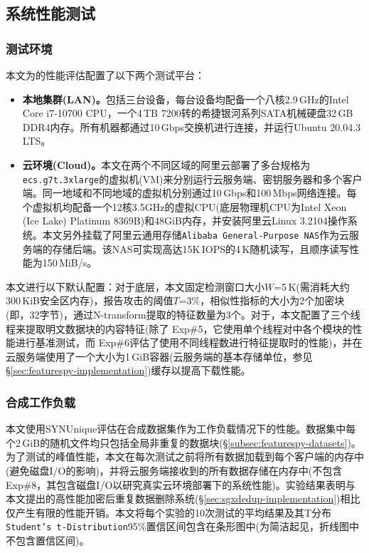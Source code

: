 \subsection{系统性能测试}
\label{subsec:featurespy-evaluation-performance}

\subsubsection{测试环境}
\label{subsubsec:featurespy-platform}

本文为\prototype 的性能评估配置了以下两个测试平台：

\begin{itemize}[leftmargin=*]
    \item {\bf 本地集群(LAN)。}包括三台设备，每台设备均配备一个八核2.9\,GHz的Intel Core i7-10700 CPU，一个4\,TB 7200转的希捷银河系列SATA机械硬盘32\,GB DDR4内存。所有机器都通过10\,Gbps交换机进行连接，并运行Ubuntu 20.04.3 LTS。
    \item {\bf 云环境(Cloud)。}本文在两个不同区域的阿里云\cite{Alibaba}部署了多台规格为{\tt ecs.g7t.3xlarge}的虚拟机(VM)来分别运行云服务端、密钥服务器和多个客户端。同一地域和不同地域的虚拟机分别通过10\,Gbps和100\,Mbps网络连接。每个虚拟机均配备一个12核3.5GHz的虚拟CPU(底层物理机CPU为Intel Xeon (Ice Lake) Platinum 8369B)和48GiB内存，并安装阿里云Linux 3.2104操作系统。本文另外挂载了阿里云通用存储{\tt Alibaba General-Purpose NAS}作为云服务端的存储后端。该NAS可实现高达15K\,IOPS的4\,K随机读写，且顺序读写性能为150\,MiB/s。
\end{itemize}

本文进行以下默认配置：对于底层\sysnameF，本文固定检测窗口大小$W$=5\,K(需消耗大约300\,KiB安全区内存)，报告攻击的阈值$T$=3\%，相似性指标的大小为2个加密块(即，32字节)，通过N-transform提取的特征数量为3个。对于\prototype，本文配置了三个线程来提取明文数据块的内容特征(除了 Exp\#5，它使用单个线程对\prototype 中各个模块的性能进行基准测试，而 Exp\#6评估了\prototype 使用不同线程数进行特征提取时的性能)，并在云服务端使用了一个大小为1\,GiB容器(云服务端的基本存储单位，参见\S\ref{sec:featurespy-implementation})缓存以提高下载性能。

\subsubsection{合成工作负载}
\label{subsubsec:featurespy-syn}
本文使用SYNUnique评估\prototype 在合成数据集作为工作负载情况下的性能。数据集中每个2\,GiB的随机文件均只包括全局非重复的数据块(\S\ref{subsec:featurespy-datasets})。为了测试\prototype 的峰值性能，本文在每次测试之前将所有数据加载到每个客户端的内存中(避免磁盘I/O的影响)，并将云服务端接收到的所有数据存储在内存中(不包含Exp\#8，其包含磁盘I/O以研究真实云环境部署下的系统性能)。实验结果表明\prototype 与本文提出的高性能加密后重复数据删除系统\sysnameS (\S\ref{sec:sgxdedup-implementation})相比仅产生有限的性能开销。本文将每个实验的10次测试的平均结果及其T分布{\tt Student's t-Distribution}95\%置信区间包含在条形图中(为简洁起见，折线图中不包含置信区间)。

